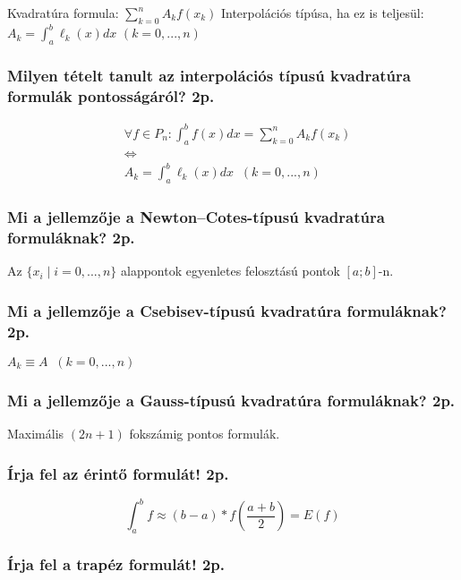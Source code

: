 \documentclass[12pt,a4paper]{article}
\begin{document}
\begin{outline}
	\1 Kvadratúra formula: $\sum_{k=0}^n A_k f(x_k)$
	\1 Interpolációs típúsa, ha ez is teljesül: $A_k =\int_{a}^{b} \ell_k(x) dx$ \;\; $(k=0,...,n)$
\end{outline}

\subsubsection{Milyen tételt tanult az interpolációs típusú kvadratúra formulák pontosságáról? 2p.}

\begin{align*}
	&\forall f \in P_n: \int_{a}^{b} f(x) dx = \sum_{k=0}^{n} A_k f(x_k) \\
	&\Leftrightarrow \\
	&A_k = \int_{a}^{b} \ell_k(x) dx \;\; (k=0,...,n)
\end{align*}

\pagebreak

\subsubsection{Mi a jellemzője a Newton--Cotes-típusú kvadratúra formuláknak? 2p.}

Az $\{x_i \;|\; i=0,...,n\}$ alappontok egyenletes felosztású pontok $[a;b]$-n.

\subsubsection{Mi a jellemzője a Csebisev-típusú kvadratúra formuláknak? 2p.}

$A_k \equiv A \;\; (k=0,...,n)$

\subsubsection{Mi a jellemzője a Gauss-típusú kvadratúra formuláknak? 2p.}

Maximális $(2n+1)$ fokszámig pontos formulák.

\subsubsection{Írja fel az érintő formulát! 2p.}

$$\int_{a}^{b} f \approx (b-a) * f(\frac{a+b}{2}) = E(f)$$

\subsubsection{Írja fel a trapéz formulát! 2p.}
\end{document}
